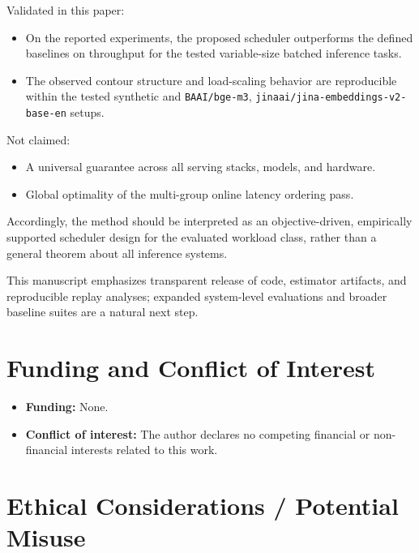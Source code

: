 \documentclass{article}
\providecommand{\tightlist}{\setlength{\itemsep}{0pt}\setlength{\parskip}{0pt}}
\begin{document}
Validated in this paper:

\begin{itemize}
\tightlist
\item
  On the reported experiments, the proposed scheduler outperforms the
  defined baselines on throughput for the tested variable-size batched
  inference tasks.
\item
  The observed contour structure and load-scaling behavior are
  reproducible within the tested synthetic and \texttt{BAAI/bge-m3},
  \texttt{jinaai/jina-embeddings-v2-base-en} setups.
\end{itemize}

Not claimed:

\begin{itemize}
\tightlist
\item
  A universal guarantee across all serving stacks, models, and hardware.
\item
  Global optimality of the multi-group online latency ordering pass.
\end{itemize}

Accordingly, the method should be interpreted as an objective-driven,
empirically supported scheduler design for the evaluated workload class,
rather than a general theorem about all inference systems.

This manuscript emphasizes transparent release of code, estimator
artifacts, and reproducible replay analyses; expanded system-level
evaluations and broader baseline suites are a natural next step.

\hypertarget{10-funding-and-conflict-of-interest}{%
\section{Funding and Conflict of
Interest}\label{10-funding-and-conflict-of-interest}}

\begin{itemize}
\tightlist
\item
  \textbf{Funding:} None.
\item
  \textbf{Conflict of interest:} The author declares no competing
  financial or non-financial interests related to this work.
\end{itemize}

\hypertarget{11-ethical-considerations--potential-misuse}{%
\section{Ethical Considerations / Potential
Misuse}\label{11-ethical-considerations--potential-misuse}}
\end{document}
